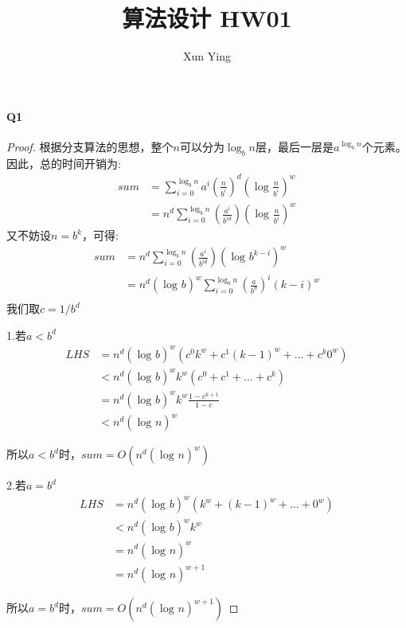 \documentclass[UTF8]{ctexart}
\renewcommand{\(}{\left(}
\renewcommand{\)}{\right)}
\begin{document}
\title{算法设计 HW01}  
\author{Xun Ying}
\maketitle

\paragraph{Q1} 
\begin{proof}

根据分支算法的思想，整个$n$可以分为$\log_{b}{n}$层，最后一层是$a^{\log_{b}{n}}$个元素。
因此，总的时间开销为:
$$
\begin{aligned}
	sum&=\sum_{i=0}^{\log_{b}{n}} {a^{i}\(\frac{n}{b^{i}} \)^{d}\(\log_{}{\frac{n}{b^{i}}}\)^{w}}  \\
    &=n^{d}\sum_{i=0}^{\log_{b}{n}} {\(\frac{a^{i}}{{b^{id}}} \)}\(\log_{}{\frac{n}{b^{i}}}\)^{w} 
\end{aligned}
$$
又不妨设$n=b^{k}$，可得:
$$
\begin{aligned}
    sum&=n^{d}\sum_{i=0}^{\log_{b}{n}} {\(\frac{a^{i}}{{b^{id}}} \)}\(\log_{}{{b^{k-i}}}\)^{w} \\
    &=n^{d}\(\log_{}{b}\)^{w}\sum_{i=0}^{\log_{b}{n}} {\(\frac{a}{{b^{d}}} \)^{i}}\(k-i\)^{w}  \\
\end{aligned}
$$
我们取$c=1/b^{d}$

1.若$a<b^{d}$
$$
\begin{aligned}
    LHS &=n^{d}\(\log_{}{b}\)^{w}\(c^{0}k^{w}+c^{1}\(k-1\)^{w}+...+c^{k}0^{w}\)\\
 &<n^{d}\(\log_{}{b}\)^{w}k^{w}\(c^{0}+c^{1}+...+c^{k}\)\\                 
 &=n^{d}\(\log_{}{b}\)^{w}k^{w}\frac{1-c^{k+1}}{1-c}\\
&<n^{d}\(\log_{}{n}\)^{w}
\end{aligned}
$$

所以$a<b^{d}$时，$sum=O\(n^{d}\(\log_{}{n}\)^{w}\)$
    

2.若$a=b^{d}$
$$
\begin{aligned}
    LHS&=n^{d}\(\log_{}{b}\)^{w}\(k^{w}+\(k-1\)^{w}+...+0^{w}\) \\
&<n^{d}\(\log_{}{b}\)^{w}k^{w}\\
&=n^{d}\(\log_{}{n}\)^{w}\\
&=n^{d}\(\log_{}{n}\)^{w+1}
\end{aligned}
$$


所以$a=b^{d}$时，$sum=O\(n^{d}\(\log_{}{n}\)^{w+1}\)$


\end{proof}
\end{document}
